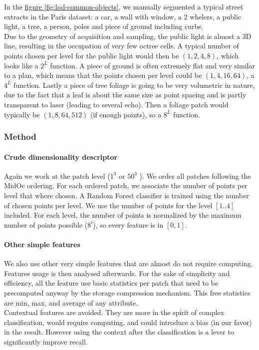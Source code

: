 			In the \href{fig:lod-common-objects}{figure \ref{fig:lod-common-objects}}, we manually segmented a typical street extracts in the Paris dataset: a car, a wall with window, a 2 whelers, a public light, a tree, a person, poles and piece of ground including curbs.
			\\
			Due to the geometry of acquisition and sampling, the public light is almost a 3D line, resulting in the occupation of very few octree cells.
			A typical number of points chosen per level  for the public light would then be $(1,2,4,8)$, which looks like a $2^L$ function.
			A piece of ground is often extremely flat and very similar to a plan, which means that the points chosen per level could be $(1,4,16,64)$, a $4^L$ function.
			Lastly a piece of tree foliage is going to be very volumetric in nature, due to the fact that a leaf is about the same size as point spacing and is partly transparent to laser (leading to several echo).
			Then a foliage patch would typically be $(1,8,64,512)$ (if enough points), so a $8^L$ function.
			
		\subsubsection{Method}
			\paragraph{Crude dimensionality descriptor}
				Again we work at the patch level ($1^3$ or $50^3$ \cubic \meter).
				We order all patches following the MidOc ordering. For each ordered patch, we associate the number of points per level that where chosen.
				A Random Forest classifier is trained using the number of chosen points per level.
				We use the number of points for the level $[1..4]$ included. For each level, the number of points is normalized by the maximum number of points possible ($8^i$), so every feature is in $[0,1]$.
			
			\paragraph{Other simple features}
				We also use other very simple features that are almost do not require computing. Features usage is then analysed afterwards.
				For the sake of simplicity and efficiency, all the feature use basic statistics per patch that need to be precomputed anyway by the storage compression mechanism. This free statistics are min, max, and average of any attribute.
				\\
				Contextual features are avoided. They are more in the spirit of complex classification, would require computing, and could introduce a bias (in our favor) in the result.
				However using the context after the classification is a lever to significantly improve recall.
			
